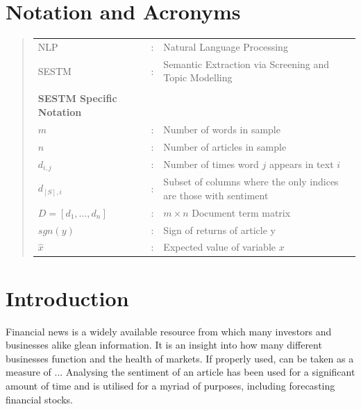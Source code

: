 \documentclass[ oneside,%
                    author={Joshua Felmeden},
                    degree={MEng},
                     title={Semantic Analysis of Financial Headlines Based on Realised Stock Returns},
                  subtitle={}]{dissertation}
\begin{document}

\chapter*{Notation and Acronyms}

\begin{quote}
\noindent
\begin{tabular}{lcl}
NLP               &:    &     Natural Language Processing \\
SESTM             &:    &     Semantic Extraction via Screening and Topic Modelling \\
\\
\textbf{SESTM Specific Notation} \\
$m$               &:    &     Number of words in sample \\
$n$               &:    &     Number of articles in sample \\
$d_{i,j}$         &:    &     Number of times word $j$ appears in text $i$ \\
$d_{[S],i}$       &:    &     Subset of columns where the only indices are those with sentiment \\
$D = [d_1, \dots, d_n]$ &:    & $m \times n$ Document term matrix \\
$sgn(y)$          &:    &     Sign of returns of article y \\
$\hat x$          &:    &    Expected value of variable $x$ \\
\end{tabular}
\end{quote}



%

\mainmatter


\chapter{Introduction}
\label{chap:context}
Financial news is a widely available resource from which many investors and businesses alike glean information. It is an insight into how many different businesses function and the health of markets. If properly used, can be taken as a measure of ... Analysing the sentiment of an article has been used for a significant amount of time and is utilised for a myriad of purposes, including forecasting financial stocks.
\end{document}
